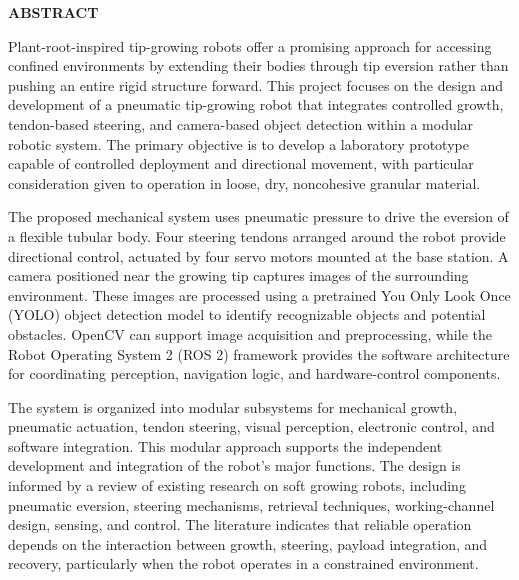 \clearpage
{}
\thispagestyle{footeronly}
\begin{center}
{\fontsize{16}{20}\selectfont \textbf{ABSTRACT}}
\end{center}

\vspace{0.4cm}
\justifying

Plant-root-inspired tip-growing robots offer a promising approach for accessing confined environments by extending their bodies through tip eversion rather than pushing an entire rigid structure forward. This project focuses on the design and development of a pneumatic tip-growing robot that integrates controlled growth, tendon-based steering, and camera-based object detection within a modular robotic system. The primary objective is to develop a laboratory prototype capable of controlled deployment and directional movement, with particular consideration given to operation in loose, dry, noncohesive granular material.

The proposed mechanical system uses pneumatic pressure to drive the eversion of a flexible tubular body. Four steering tendons arranged around the robot provide directional control, actuated by four servo motors mounted at the base station. A camera positioned near the growing tip captures images of the surrounding environment. These images are processed using a pretrained You Only Look Once (YOLO) object detection model to identify recognizable objects and potential obstacles. OpenCV can support image acquisition and preprocessing, while the Robot Operating System 2 (ROS 2) framework provides the software architecture for coordinating perception, navigation logic, and hardware-control components.

The system is organized into modular subsystems for mechanical growth, pneumatic actuation, tendon steering, visual perception, electronic control, and software integration. This modular approach supports the independent development and integration of the robot's major functions. The design is informed by a review of existing research on soft growing robots, including pneumatic eversion, steering mechanisms, retrieval techniques, working-channel design, sensing, and control. The literature indicates that reliable operation depends on the interaction between growth, steering, payload integration, and recovery, particularly when the robot operates in a constrained environment.

